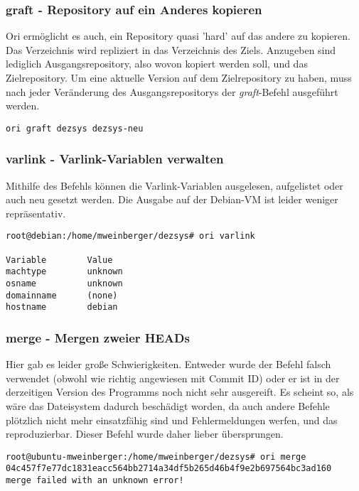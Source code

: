\subsubsection{graft - Repository auf ein Anderes kopieren}
\label{subsubsec:graft - Repository auf ein Anderes kopieren}
Ori ermöglicht es auch, ein Repository quasi 'hard' auf das andere zu kopieren. Das Verzeichnis wird repliziert in das Verzeichnis des Ziels. Anzugeben sind lediglich Ausgangsrepository, also wovon kopiert werden soll, und das Zielrepository. Um eine aktuelle Version auf dem Zielrepository zu haben, muss nach jeder Veränderung des Ausgangsrepositorys der \textit{graft}-Befehl ausgeführt werden.
\begin{lstlisting}[frame=single, caption=graft]
ori graft dezsys dezsys-neu
\end{lstlisting}

\subsubsection{varlink - Varlink-Variablen verwalten}
\label{subsubsec:varlink - Varlink-Variablen verwalten}
Mithilfe des Befehls können die Varlink-Variablen ausgelesen, aufgelistet oder auch neu gesetzt werden. Die Ausgabe auf der Debian-VM ist leider weniger repräsentativ.
\begin{lstlisting}[frame=single, caption=varlink]
root@debian:/home/mweinberger/dezsys# ori varlink

Variable        Value                                                           
machtype        unknown                                                         
osname          unknown                                                         
domainname      (none)                                                          
hostname        debian
\end{lstlisting}

\subsubsection{merge - Mergen zweier HEADs}
\label{subsubsec:remote - Mergen zweier HEADs}
Hier gab es leider große Schwierigkeiten. Entweder wurde der Befehl falsch verwendet (obwohl wie richtig angewiesen mit Commit ID) oder er ist in der derzeitigen Version des Programms noch nicht sehr ausgereift. Es scheint so, als wäre das Dateisystem dadurch beschädigt worden, da auch andere Befehle plötzlich nicht mehr einsatzfähig sind und Fehlermeldungen werfen, und das reproduzierbar. Dieser Befehl wurde daher lieber übersprungen.
\begin{lstlisting}[frame=single, caption=merge]
root@ubuntu-mweinberger:/home/mweinberger/dezsys# ori merge 04c457f7e77dc1831eacc564bb2714a34df5b265d46b4f9e2b697564bc3ad160
merge failed with an unknown error!
\end{lstlisting}

